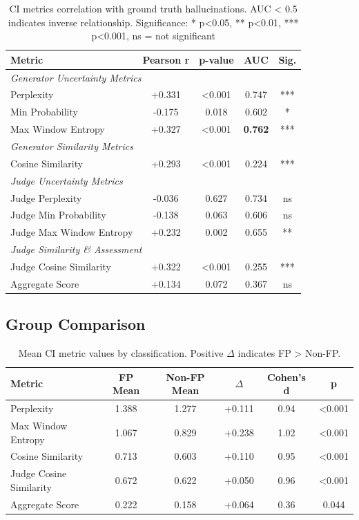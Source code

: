 \begin{table}[h]
\centering
\small
\begin{tabular}{lcccc}
\toprule
\textbf{Metric} & \textbf{Pearson r} & \textbf{p-value} & \textbf{AUC} & \textbf{Sig.} \\
\midrule
\multicolumn{5}{l}{\textit{Generator Uncertainty Metrics}} \\
Perplexity & +0.331 & <0.001 & 0.747 & *** \\
Min Probability & -0.175 & 0.018 & 0.602 & * \\
Max Window Entropy & +0.327 & <0.001 & \textbf{0.762} & *** \\
\midrule
\multicolumn{5}{l}{\textit{Generator Similarity Metrics}} \\
Cosine Similarity & +0.293 & <0.001 & 0.224 & *** \\
\midrule
\multicolumn{5}{l}{\textit{Judge Uncertainty Metrics}} \\
Judge Perplexity & -0.036 & 0.627 & 0.734 & ns \\
Judge Min Probability & -0.138 & 0.063 & 0.606 & ns \\
Judge Max Window Entropy & +0.232 & 0.002 & 0.655 & ** \\
\midrule
\multicolumn{5}{l}{\textit{Judge Similarity \& Assessment}} \\
Judge Cosine Similarity & +0.322 & <0.001 & 0.255 & *** \\
Aggregate Score & +0.134 & 0.072 & 0.367 & ns \\
\bottomrule
\end{tabular}
\caption{CI metrics correlation with ground truth hallucinations. AUC < 0.5 indicates inverse relationship. Significance: * p<0.05, ** p<0.01, *** p<0.001, ns = not significant}
\label{tab:rq2_correlations}
\end{table}

\subsection{Group Comparison}

\begin{table}[h]
\centering
\small
\begin{tabular}{lccccc}
\toprule
\textbf{Metric} & \textbf{FP Mean} & \textbf{Non-FP Mean} & \textbf{$\Delta$} & \textbf{Cohen's d} & \textbf{p} \\
\midrule
Perplexity & 1.388 & 1.277 & +0.111 & 0.94 & <0.001 \\
Max Window Entropy & 1.067 & 0.829 & +0.238 & 1.02 & <0.001 \\
Cosine Similarity & 0.713 & 0.603 & +0.110 & 0.95 & <0.001 \\
Judge Cosine Similarity & 0.672 & 0.622 & +0.050 & 0.96 & <0.001 \\
Aggregate Score & 0.222 & 0.158 & +0.064 & 0.36 & 0.044 \\
\bottomrule
\end{tabular}
\caption{Mean CI metric values by classification. Positive $\Delta$ indicates FP > Non-FP.}
\label{tab:rq2_group_comparison}
\end{table}

